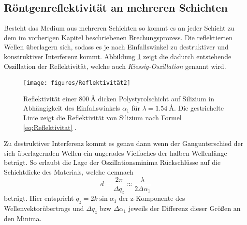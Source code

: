 \subsection*{Röntgenreflektivität an mehreren Schichten}
Besteht das Medium aus mehreren Schichten so kommt es an jeder Schicht zu dem im vorherigen Kapitel beschriebenen Brechungsprozess.
Die reflektierten Wellen überlagern sich, sodass es je nach Einfallswinkel zu destruktiver und konstruktiver Interferenz kommt.
Abbildung \ref{fig:tfig3} zeigt die dadurch entstehende Oszillation der Reflektivität, welche auch \textit{Kiessig-Oszillation} genannt wird.
\begin{figure}[H]
\centering
\texttt{[image: figures/Reflektivität2]}
\caption{Reflektivität einer $\SI{800}{\angstrom}$ dicken Polystyrolschicht auf Silizium in Abhängigkeit des Einfallswinkels $\alpha_1$ für $\lambda = \SI{1,54}{\angstrom}$.
Die gestrichelte Linie zeigt die Reflektivität von Silizium nach Formel \eqref{eq:Reflektivitat} \cite{skript}.}
\label{fig:tfig3}
\end{figure}
Zu destruktiver Interferenz kommt es genau dann wenn der Gangunterschied der sich überlagernden Wellen ein ungerades Vielfaches der halben Wellenlänge beträgt.
So erlaubt die Lage der Oszillationsminima Rückschlüsse auf die Schichtdicke des Materials, welche demnach
\begin{equation}
    d = \frac{2\pi}{\Delta q_z}\approx \frac{\lambda}{2\Delta \alpha_1}
\end{equation}
beträgt.
Hier entspricht $q_z=2k\sin{\alpha_1}$ der z-Komponente des Wellenvektorübertrags und $\Delta q_z$ bzw $\Delta \alpha_1$ jeweils der Differenz dieser Größen an den Minima.

